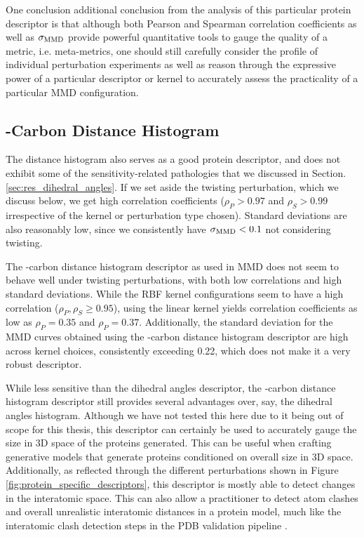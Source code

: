 One conclusion additional conclusion from the analysis of this particular
protein descriptor is that although both Pearson and Spearman correlation
coefficients as well as $\sigma_{\text{MMD}}$ provide powerful quantitative tools to
gauge the quality of a metric, i.e. meta-metrics, one should still carefully
consider the profile of individual perturbation experiments as well as reason
through the expressive power of a particular descriptor or kernel to accurately
assess the practicality of a particular MMD configuration.


\subsection{\textalpha{}-Carbon Distance Histogram}

The distance histogram also serves as a good protein descriptor, and does not
exhibit some of the sensitivity-related pathologies that we discussed in Section.
\ref{sec:res_dihedral_angles}. If we set aside the twisting perturbation, which
we discuss below, we get high correlation coefficients ($\rho_P>0.97$ and
$\rho_S>0.99$ irrespective of the kernel or perturbation type chosen). Standard
deviations are also reasonably low, since we consistently have $\sigma_{\text{MMD}}<0.1$
not considering twisting.

The \textalpha{}-carbon distance histogram descriptor as used in MMD does not
seem to behave well under twisting perturbations, with both low correlations and
high standard deviations. While the RBF kernel configurations seem to have a
high correlation ($\rho_P,\rho_S\geq 0.95$), using the linear kernel yields
correlation coefficients as low as $\rho_P=0.35$ and $\rho_P=0.37$.
Additionally, the standard deviation for the MMD curves obtained using the
\textalpha{}-carbon distance histogram descriptor are high across kernel
choices, consistently exceeding 0.22, which does not make it a very robust
descriptor.

While less sensitive than the dihedral angles descriptor, the
\textalpha{}-carbon distance histogram descriptor still provides several
advantages over, say, the dihedral angles histogram. Although we have not tested
this here due to it being out of scope for this thesis, this descriptor can
certainly be used to accurately gauge the size in 3D space of the proteins
generated. This can be useful when crafting generative models that generate
proteins conditioned on overall size in 3D space. Additionally, as reflected
through the different perturbations shown in Figure
\ref{fig:protein_specific_descriptors}, this descriptor is mostly able to detect
changes in the interatomic space. This can also allow a practitioner to detect
atom clashes and overall unrealistic interatomic distances in a protein model,
much like the interatomic clash detection steps in the PDB validation pipeline
\citep{read2011new, gore2012implementing, gore2017validation}.



